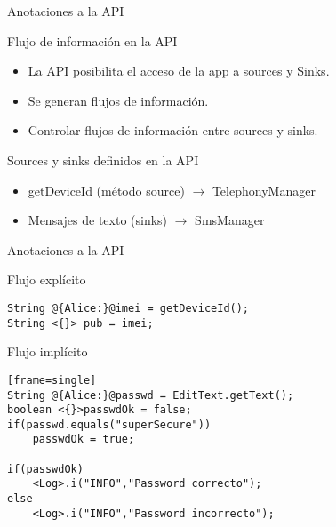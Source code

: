 \begin{frame}{Anotaciones a la API} 
\begin{block}{Flujo de información en la API}
	\begin{itemize}
	  \item La API posibilita el acceso de la app a sources y Sinks.
	  \item Se generan flujos de información.
	  \item Controlar flujos de información entre sources y sinks.
	\end{itemize}
\end{block}
\begin{block}{Sources y sinks definidos en la API}
	\begin{itemize}
	  \item getDeviceId (método source) $\rightarrow$ TelephonyManager
	  \item Mensajes de texto (sinks) $\rightarrow$ SmsManager
	\end{itemize}
\end{block}
\end{frame}

\begin{frame}[fragile]{Anotaciones a la API}
\begin{block}{Flujo explícito}
\begin{center}
\begin{lstlisting}[style=base2]
String @{Alice:}@imei = getDeviceId();
String <{}> pub = imei;
\end{lstlisting}
\end{center}
\end{block}

\begin{block}{Flujo implícito}
\begin{center}
\begin{lstlisting}[style=base2][frame=single]
String @{Alice:}@passwd = EditText.getText();
boolean <{}>passwdOk = false;
if(passwd.equals("superSecure"))
	passwdOk = true;
	
if(passwdOk)
	<Log>.i("INFO","Password correcto");
else
	<Log>.i("INFO","Password incorrecto");
\end{lstlisting}
\end{center}
\end{block}
\end{frame}
